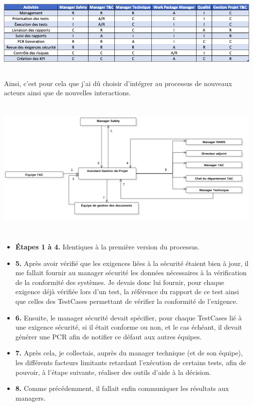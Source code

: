 \begin{center}
\includegraphics[height=4cm]{ressources/images/figures/RACI.png}
\end{center}

Ainsi, c'est pour cela que j'ai dû choisir d'intégrer au processus de nouveaux acteurs ainsi que de nouvelles interactions.

\begin{center}
\includegraphics[height=7cm]{ressources/images/figures/Workflow2.png}
\end{center}


\begin{itemize}
\item \textbf{Étapes 1 à 4.} Identiques à la première version du processus.
\item \textbf{5.} Après avoir vérifié que les exigences liées à la sécurité étaient bien à jour, il me fallait fournir au manager sécurité les données nécessaires à la vérification de la conformité des systèmes. Je devais donc lui fournir, pour chaque exigence déjà vérifiée lors d'un test, la référence du rapport de ce test ainsi que celles des \gls{TestCases} permettant de vérifier la conformité de l'exigence.
\item \textbf{6.} Ensuite, le manager sécurité devait spécifier, pour chaque \gls{TestCases} lié à une exigence sécurité, si il était conforme ou non, et le cas échéant, il devait générer une \gls{PCR} afin de notifier ce défaut aux autres équipes.
\item \textbf{7.} Après cela, je collectais, auprès du manager technique (et de son équipe), les différents facteurs limitants retardant l'exécution de certains tests, afin de pouvoir, à l'étape suivante, réaliser des outils d'aide à la décision.
\item \textbf{8.} Comme précédemment, il fallait enfin communiquer les résultats aux managers.
\end{itemize}

